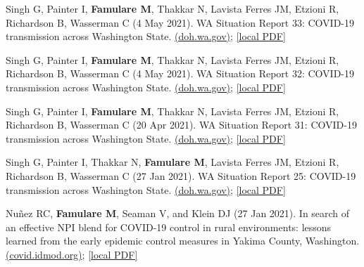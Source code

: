\documentclass{article}
\begin{document}
\begin{llist}
\begin{items}
	\item[{[49]}] Singh G, Painter I, \textbf{Famulare M}, Thakkar N,  Lavista Ferres JM, Etzioni R, Richardson B, Wasserman C (4 May 2021). WA Situation Report 33: COVID-19 transmission across Washington State. \href{https://www.doh.wa.gov/Portals/1/Documents/1600/coronavirus/data-tables/820-114-SituationReport-20210519.pdf}{(doh.wa.gov)}; \href{https://famulare.github.io/assets/publication-mirror/820-114-SituationReport-20210519.pdf}{[local PDF]}
	
	\item[{[48]}] Singh G, Painter I, \textbf{Famulare M}, Thakkar N,  Lavista Ferres JM, Etzioni R, Richardson B, Wasserman C (4 May 2021). WA Situation Report 32: COVID-19 transmission across Washington State. \href{https://www.doh.wa.gov/Portals/1/Documents/1600/coronavirus/data-tables/820-114-SituationReport-20210505.pdf}{(doh.wa.gov)}; \href{https://famulare.github.io/assets/publication-mirror/820-114-SituationReport-20210505.pdf}{[local PDF]}
		
	\item[{[47]}] Singh G, Painter I, \textbf{Famulare M}, Thakkar N,  Lavista Ferres JM, Etzioni R, Richardson B, Wasserman C (20 Apr 2021). WA Situation Report 31: COVID-19 transmission across Washington State. \href{https://www.doh.wa.gov/Portals/1/Documents/1600/coronavirus/data-tables/820-114-SituationReport-20210421.pdf}{(doh.wa.gov)}; \href{https://famulare.github.io/assets/publication-mirror/820-114-SituationReport-20210421.pdf}{[local PDF]}
	
	\item[{[46]}] Singh G, Painter I, Thakkar N, \textbf{Famulare M}, Lavista Ferres JM, Etzioni R, Richardson B, Wasserman C (27 Jan 2021). WA Situation Report 25: COVID-19 transmission across Washington State. \href{https://www.doh.wa.gov/Portals/1/Documents/1600/coronavirus/data-tables/820-114-SituationReport-01272021.pdf}{(doh.wa.gov)}; \href{https://famulare.github.io/assets/publication-mirror/820-114-SituationReport-01272021.pdf}{[local PDF]}
	
	\item[{[45]}] Nu\~nez RC, \textbf{Famulare M}, Seaman V, and Klein DJ (27 Jan 2021). In search of an effective NPI blend for COVID-19 control in rural environments: lessons learned from the early epidemic control measures in Yakima County, Washington. \href{https://iazpvnewgrp01.blob.core.windows.net/source/2021-02/reports/pdf/Effect-of-NPIs-in-Yakima-County.pdf}{(covid.idmod.org)}; \href{https://famulare.github.io/assets/publication-mirror/Effect-of-NPIs-in-Yakima-County.pdf}{[local PDF]}
	

\end{items}
\end{llist}
\end{document}
